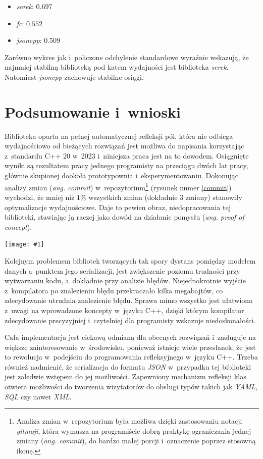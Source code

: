 \documentclass[12pt]{article}
\newcommand{\n}{\newline}
\newcommand{\putfig}[3]{
\begin{captioned}[H]
	\centering
	\texttt{[image: \#1]}
	\caption{#2}
	\label{#3}
	\medskip
\end{captioned}
}
\newcommand{\nonpl}[1]{{\it #1}}
\newcommand{\ang}[1]{\nonpl{ang. #1}}
\newcommand{\JSON}{\nonpl{JSON} }
\newcommand{\serek}{\nonpl{serek}}
\begin{document}
{{{				{
					\begin{itemize}
						\setlength\itemsep{-2mm}
						\item \serek: $0.697$
						\item \nonpl{fc}: $0.552$
						\item \nonpl{jsoncpp}: $0.509$
					\end{itemize}
				}

				Zarówno wykres jak i~policzone odchylenie standardowe wyraźnie wskazują, że najmniej stabilną biblioteką pod katem wydajności jest biblioteka \serek.
				Natomiast \nonpl{jsoncpp} zachowuje stabilne osiągi.
			}
		}

		{
			\section{Podsumowanie i~wnioski}

			Biblioteka oparta na pełnej automatycznej refleksji pól, która nie odbiega wydajnościowo od bieżących rozwiązań jest możliwa do napisania korzystając
			z~standardu C++ 20 w~2023 i~niniejsza praca jest na to dowodem. Osiągnięte wyniki są rezultatem pracy jednego programisty na przeciągu dwóch lat
			pracy, głównie skupionej dookoła prototypownia i~eksperymentowaniu. Dokonując analizy zmian (\ang{commit}) w~repozytorium\footnote{
				Analiza zmian w~repozytorium była możliwa dzięki zastosowaniu notacji \nonpl{gitmoji}\cite{gitmoji}, która wymusza na programiście dobrą praktykę
				ograniczania jednej zmiany (\ang{commit}), do bardzo małej porcji i~oznaczenie poprzez stosowną ikonę.
			} (rysunek numer \ref{commit}) wychodzi, że mniej niż $1\%$ wszystkich zmian (dokładnie $3$ zmiany) stanowiły optymalizacje wydajnościowe. Daje to pewien obraz,
			niedopracowania tej biblioteki, stawiając ją raczej jako dowód na działanie pomysłu (\ang{proof of concept}).\n

			\putfig{./charts/pre_generated_charts/commit_percentage.png}{Udział rodzajów zmian w~całym repozytorium \serek}{commit}

			\newpage

			Kolejnym problemem bibliotek tworzących tak spory dystans pomiędzy modelem danych a~punktem jego serializacji, jest zwiększenie poziomu trudności
			przy wytwarzaniu kodu, a~dokładnie przy analizie błędów. Niejednokrotnie wyjście z~kompilatora po znalezieniu błędu przekraczało kilka megabajtów,
			co zdecydowanie utrudnia znalezienie błędu. Sprawa mimo wszystko jest ułatwiona z~uwagi na wprowadzone koncepty w~języku C++, dzięki którym kompilator
			zdecydowanie precyzyjniej i~czytelniej dla programisty wskazuje niedoskonałości.\n

			Cała implementacja jest ciekawą odmianą dla obecnych rozwiązań i~zasługuje na większe zainteresowanie w~środowisku, ponieważ istnieje wiele przesłanek, że
			jest to rewolucja w~podejściu do programowania refleksyjnego w~języku C++. Trzeba również nadmienić, że serializacja do formatu \JSON w~przypadku tej biblioteki
			jest zaledwie wstępem do jej możliwości. Zapewniony mechanizm refleksji klas otwiera możliwości do tworzenia wizytatorów do obsługi typów takich jak \nonpl{YAML}, \nonpl{SQL}
			czy nawet \nonpl{XML}.
		}
	}
\end{document}
